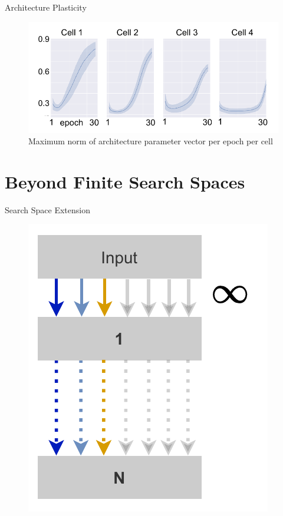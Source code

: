 \documentclass[]{beamer}
\begin{document}
\begin{frame}{Architecture Plasticity}
\vspace{10pt}
\vfill
\begin{figure}
    \includegraphics[scale=0.75, center]{graphics/alpha_curves.pdf}
    \caption{Maximum norm of architecture parameter vector per epoch per cell}
\end{figure}
\end{frame}

\section{Beyond Finite Search Spaces}
\begin{frame}{Search Space Extension}
\vspace{10pt}
\vfill
\begin{figure}
    \begin{center}
    \includegraphics[scale=0.8]{graphics/quick/search_space_extension.drawio.pdf}
    \caption{}
  \end{center} 
\end{figure}
\end{frame}
\end{document}
